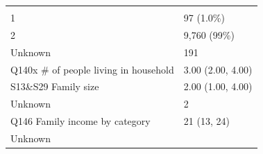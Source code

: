 \documentclass[]{article}
\begin{document}
\begin{longtable}[]{@{}ll@{}}
\begin{minipage}[t]{0.23\columnwidth}
\strut
\end{minipage}\tabularnewline
\begin{minipage}[t]{0.71\columnwidth}\raggedright
1\strut
\end{minipage} & \begin{minipage}[t]{0.23\columnwidth}\raggedright
97 (1.0\%)\strut
\end{minipage}\tabularnewline
\begin{minipage}[t]{0.71\columnwidth}\raggedright
2\strut
\end{minipage} & \begin{minipage}[t]{0.23\columnwidth}\raggedright
9,760 (99\%)\strut
\end{minipage}\tabularnewline
\begin{minipage}[t]{0.71\columnwidth}\raggedright
Unknown\strut
\end{minipage} & \begin{minipage}[t]{0.23\columnwidth}\raggedright
191\strut
\end{minipage}\tabularnewline
\begin{minipage}[t]{0.71\columnwidth}\raggedright
Q140x \# of people living in household\strut
\end{minipage} & \begin{minipage}[t]{0.23\columnwidth}\raggedright
3.00 (2.00, 4.00)\strut
\end{minipage}\tabularnewline
\begin{minipage}[t]{0.71\columnwidth}\raggedright
S13\&S29 Family size\strut
\end{minipage} & \begin{minipage}[t]{0.23\columnwidth}\raggedright
2.00 (1.00, 4.00)\strut
\end{minipage}\tabularnewline
\begin{minipage}[t]{0.71\columnwidth}\raggedright
Unknown\strut
\end{minipage} & \begin{minipage}[t]{0.23\columnwidth}\raggedright
2\strut
\end{minipage}\tabularnewline
\begin{minipage}[t]{0.71\columnwidth}\raggedright
Q146 Family income by category\strut
\end{minipage} & \begin{minipage}[t]{0.23\columnwidth}\raggedright
21 (13, 24)\strut
\end{minipage}\tabularnewline
\begin{minipage}[t]{0.71\columnwidth}\raggedright
Unknown\strut

\end{minipage}
\end{longtable}
\end{document}
